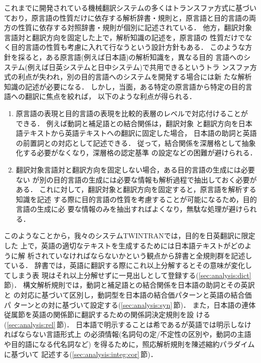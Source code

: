 これまでに開発されている機械翻訳システムの多くはトランスファ方式に基づい
ており，原言語の性質だけに依存する解析辞書・規則と，原言語と目的言語の両
方の性質に依存する対照辞書・規則が個別に記述されている．
他方，翻訳対象言語対と翻訳方向を固定した上で，解析知識の記述を，原言語の
性質だけでなく目的言語の性質も考慮に入れて行なうという設計方針もある．
このような方針を採ると，ある原言語(例えば日本語)の解析知識を，異なる目的
言語へのシステム(例えば日英システムと日中システム)で共用できるというトラ
ンスファ方式の利点が失われ，別の目的言語へのシステムを開発する場合には新
たな解析知識の記述が必要になる．
しかし，当面，ある特定の原言語から特定の目的言語への翻訳に焦点を絞れば，
以下のような利点が得られる．
\begin{enumerate}
\item 原言語の表現と目的言語の表現を比較的表層のレベルで対応付けることが
できる．
例えば動詞と補足語との結合関係は，翻訳対象
と翻訳方向を日本語テキストから英語テキストへの翻訳に固定した場合，
日本語の助詞と英語の前置詞との対応として記述できる．
従って，結合関係を深層格として抽象化する必要がなくなり，深層格の認定基準
の設定などの困難が避けられる．
\item 
翻訳対象言語対と翻訳方向を固定しない場合，ある目的言語の生成には必要ない
が別の目的言語の生成には必要な情報も解析過程で抽出しておく必要がある．
これに対して，翻訳対象と翻訳方向を固定すると，原言語を解析する知識を記述
する際に目的言語の性質を考慮することが可能になるため，目的言語の生成に必
要な情報のみを抽出すればよくなり，無駄な処理が避けられる．
\end{enumerate}

このようなことから，我々のシステムTWINTRANでは，目的を日英翻訳に限定した
上で，英語の適切なテキストを生成するためには日本語テキストがどのように解
析されていなければならないかという観点から辞書と全規則群を記述している．
辞書では，英語に翻訳する際にこれ以上分解するとその意味が変化してしまう表
現はそれ以上分解せずに一見出しとして登録する(\ref{sec:analysis:dict}\,節)．
構文解析規則では，動詞と補足語との結合関係を日本語の助詞とその英訳と
の対応に基づいて区別し，動詞型を日本語の結合価パターンと英語の結合価パ
ターンとの対に基づいて設定する(\ref{sec:analysis:syn}\,節)．
また，日本語の連体従属節を英語の関係節に翻訳するための関係詞決定規則を設
ける(\ref{sec:analysis:rel}\,節)．
日本語で明示することは希であるが英語では明示しなければならない言語形式上
の必須情報(名詞句の定/不定性の区別や，動詞の主語や目的語になる代名詞など)
を得るために，照応解析規則を陳述縮約パラダイム\cite{Jelinek95}に基づいて
記述する(\ref{sec:analysis:integ:cor}\,節)．


